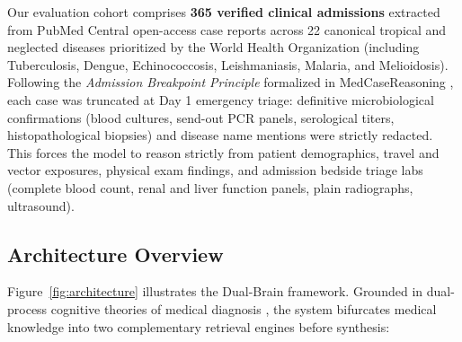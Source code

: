 \documentclass{article}
\begin{document}
Our evaluation cohort comprises \textbf{365 verified clinical admissions} extracted from PubMed Central open-access case reports across 22 canonical tropical and neglected diseases prioritized by the World Health Organization \citep{who2020road} (including Tuberculosis, Dengue, Echinococcosis, Leishmaniasis, Malaria, and Melioidosis). Following the \emph{Admission Breakpoint Principle} formalized in MedCaseReasoning \citep{wu2025medcasereasoning}, each case was truncated at Day 1 emergency triage: definitive microbiological confirmations (blood cultures, send-out PCR panels, serological titers, histopathological biopsies) and disease name mentions were strictly redacted. This forces the model to reason strictly from patient demographics, travel and vector exposures, physical exam findings, and admission bedside triage labs (complete blood count, renal and liver function panels, plain radiographs, ultrasound).

\subsection{Architecture Overview}

Figure~\ref{fig:architecture} illustrates the Dual-Brain framework. Grounded in dual-process cognitive theories of medical diagnosis \citep{schmidt1990cognitive,croskerry2009universal}, the system bifurcates medical knowledge into two complementary retrieval engines before synthesis:
\end{document}
